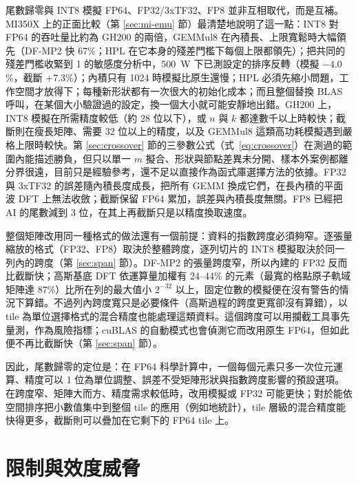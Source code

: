 尾數歸零與 INT8 模擬 FP64、FP32/3xTF32、FP8 並非互相取代，而是互補。MI350X 上的正面比較（第 \ref{sec:mi-emu} 節）最清楚地說明了這一點：INT8 對 FP64 的吞吐量比約為 GH200 的兩倍，GEMMul8 在內積長、上限寬鬆時大幅領先（DF-MP2 快 67\%；HPL 在它本身的殘差門檻下每個上限都領先）；把共同的殘差門檻收緊到 1 的敏感度分析中，500~W 下已測設定的排序反轉（模擬 $-4.0$\%，截斷 +7.3\%）；內積只有 1024 時模擬比原生還慢；HPL 必須先縮小問題，工作空間才放得下；每種新形狀都有一次很大的初始化成本；而且整個替換 BLAS 呼叫，在某個大小驗證過的設定，換一個大小就可能安靜地出錯。GH200 上，INT8 模擬在所需精度較低（約 28 位以下），或 $n$ 與 $k$ 都達數千以上時較快；截斷則在瘦長矩陣、需要 32 位以上的精度，以及 GEMMul8 這類高功耗模擬遇到嚴格上限時較快。第 \ref{sec:crossover} 節的三參數公式（式~\eqref{eq:crossover}）在測過的範圍內能描述勝負，但只以單一 $m$ 擬合、形狀與節點差異未分開、樣本外案例都離分界很遠，目前只是經驗參考，還不足以直接作為函式庫選擇方法的依據。FP32 與 3xTF32 的誤差隨內積長度成長，把所有 GEMM 換成它們，在長內積的平面波 DFT 上無法收斂；截斷保留 FP64 累加，誤差與內積長度無關。FP8 已經把 AI 的尾數減到 3 位，在其上再截斷只是以精度換取速度。

整個矩陣改用同一種格式的做法還有一個前提：資料的指數跨度必須夠窄。逐張量縮放的格式（FP32、FP8）取決於整體跨度，逐列切片的 INT8 模擬取決於同一列內的跨度（第 \ref{sec:span} 節）。DF-MP2 的張量跨度窄，所以內建的 FP32 反而比截斷快；高斯基底 DFT 依運算量加權有 24–44\% 的元素（最寬的格點原子軌域矩陣達 87\%）比所在列的最大值小 $2^{-32}$ 以上，固定位數的模擬便在沒有警告的情況下算錯。不過列內跨度寬只是必要條件（高斯過程的跨度更寬卻沒有算錯），以 tile 為單位選擇格式的混合精度也能處理這類資料。這個跨度可以用攔截工具事先量測，作為風險指標；cuBLAS 的自動模式也會偵測它而改用原生 FP64，但如此便不再比截斷快（第 \ref{sec:span} 節）。

因此，尾數歸零的定位是：在 FP64 科學計算中，一個每個元素只多一次位元運算、精度可以 1 位為單位調整、誤差不受矩陣形狀與指數跨度影響的預設選項。在跨度窄、矩陣大而方、精度需求較低時，改用模擬或 FP32 可能更快；對於能依空間排序把小數值集中到整個 tile 的應用（例如地統計），tile 層級的混合精度能快得更多，截斷則可以疊加在它剩下的 FP64 tile 上。

\section{限制與效度威脅}\label{sec:limits}

